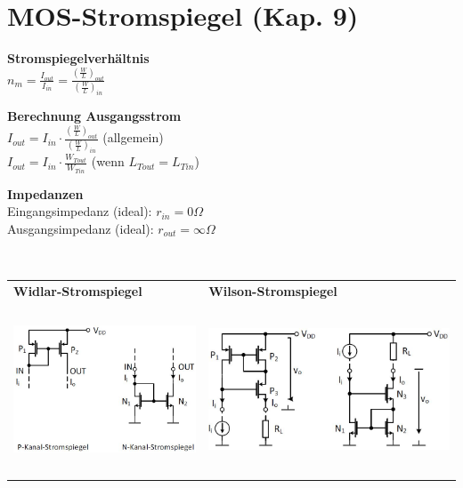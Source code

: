 
\section{MOS-Stromspiegel (Kap. 9)}

\begin{minipage}[t]{0.25\textwidth}
	\textbf{Stromspiegelverhältnis}\\
	$n_m=\frac{I_{out}}{I_{in}}=\frac{(\frac{W}{L})_{out}}{(\frac{W}{L})_{in}}$
\end{minipage}
\begin{minipage}[t]{0.35\textwidth}
	\textbf{Berechnung Ausgangsstrom}\\
	$I_{out}=I_{in}\cdot\frac{(\frac{W}{L})_{out}}{(\frac{W}{L})_{in}}$ (allgemein)\\
	$I_{out}=I_{in}\cdot \frac{W_{Tout}}{W_{Tin}}$ (wenn $L_{Tout}=L_{Tin}$)
\end{minipage}
\begin{minipage}[t]{0.35\textwidth}
	\textbf{Impedanzen}\\
	Eingangsimpedanz (ideal): $r_{in}=0\Omega$\\
	Ausgangsimpedanz (ideal): $r_{out}=\infty\Omega$
\end{minipage}\\
\begin{tabular}{|p{}|p{}|}
	\hline
	\textbf{Widlar-Stromspiegel}&\textbf{Wilson-Stromspiegel}\\
	\includegraphics[height=5cm]{chapters/Stromspiegel/images/Widlar}&\includegraphics[height=5cm]{chapters/Stromspiegel/images/Wilson}\\ \hline
\end{tabular}\\
